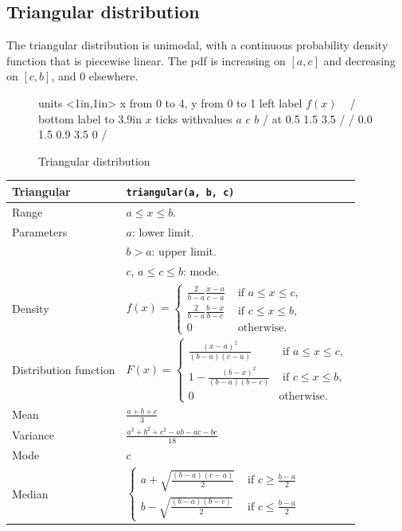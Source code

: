 \subsection{Triangular distribution}

The triangular distribution is unimodal, with a continuous probability
density function that is piecewise linear.
The pdf is increasing on $[a,c]$ and decreasing on $[c,b]$, and 0 elsewhere.

\begin{figure}[htbp]
\begin{center}
\beginpicture
\setcoordinatesystem units <1in,1in>
\setplotarea x from 0 to 4, y from 0 to 1
\axis left
  label {$f(x)$ \ } /
\axis bottom
  label {\hbox to 3.9in {\hfill $x$}} 
  ticks withvalues $a$ $c$ $b$ / at 0.5 1.5 3.5 / /
\setlinear
{}    0.0    1.5    0.9     3.5   0 /

\endpicture
\end{center}
\label{fig:trigdist}
\caption{Triangular distribution}
\end{figure}

\mbox{}

\noindent
\begin{tabularx}{\textwidth}{lX}
Triangular & \verb|triangular(a, b, c)|\\
\hline
Range & $a \leq x \leq b$.\\
Parameters & $a$: lower limit. \\
& $b > a$: upper limit. \\
& $c$, $a \leq c \leq b$: mode. \\
Density & $f(x) = 
\begin{cases}
\frac{2}{b-a} \frac{x-a}{c-a} & \mbox{ if } a \leq x \leq c, \\
\frac{2}{b-a} \frac{b-x}{b-c} & \mbox{ if } c \leq x \leq b, \\
0 & \mbox{ otherwise.}
\end{cases}$
\\
Distribution function & $F(x) =
\begin{cases}
\frac{(x-a)^2}{(b-a)(c-a)} & \mbox{ if } a \leq x \leq c, \\
1-\frac{(b-x)^2}{(b-a)(b-c)} & \mbox{ if } c \leq x \leq b, \\
0 & \mbox{otherwise.}
\end{cases}$ \\
Mean & $\frac{a +b +c}{3}$ \\
Variance & $\frac{a^2+b^2+c^2-ab-ac-bc}{18}$ \\
Mode & $c$ \\
Median & $\begin{cases}
a+\sqrt{\frac{(b-a)(c-a)}{2}} & \mbox{ if } c \geq \frac{b-a}{2} \\
b-\sqrt{\frac{(b-a)(b-c)}{2}} & \mbox{ if } c \leq \frac{b-a}{2}
\end{cases}$
\\
\hline
\end{tabularx}


